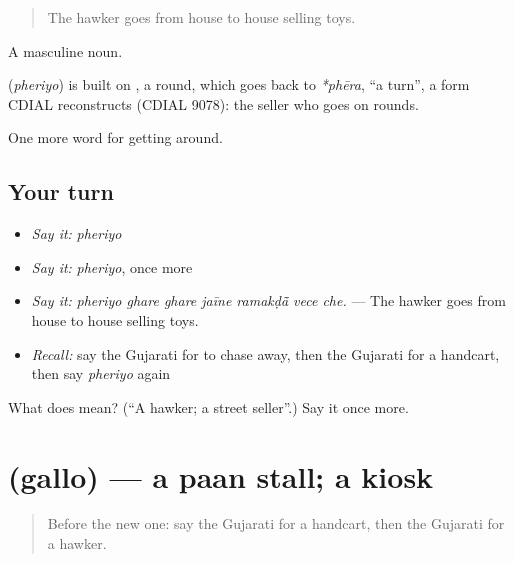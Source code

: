 \begin{quote}
The hawker goes from house to house selling toys.
\end{quote}

A masculine noun.

\begin{cousinweb}
\textbf{} (\emph{pheriyo}) is built on , a round, which goes back to \emph{*phēra}, \textquotedblleft{}a turn\textquotedblright{}, a form CDIAL reconstructs (CDIAL 9078): the seller who goes on rounds.
\end{cousinweb}

\begin{grammarlens}[title={What you've built}]
One more word for getting around.
\end{grammarlens}

\subsection*{Your turn}
\begin{itemize}
\raggedright
  \item \emph{Say it:} \emph{pheriyo}
  \item \emph{Say it:} \emph{pheriyo}, once more
  \item \emph{Say it:} \emph{pheriyo ghare ghare jaīne ramakḍā̃ vece che.} — The hawker goes from house to house selling toys.
  \item \emph{Recall:} say the Gujarati for to chase away, then the Gujarati for a handcart, then say \emph{pheriyo} again
\end{itemize}

\begin{tcolorbox}[breakable,colback=teal!4,colframe=teal!35!black,title={Before you move on}]
What does  mean? (\textquotedblleft{}A hawker; a street seller\textquotedblright{}.) Say it once more.
\end{tcolorbox}
\section[\texorpdfstring{\gu{ગલ્લો} (gallo)}{ગલ્લો (gallo)}]{ (gallo) — a paan stall; a kiosk}

\label{lesson:GU-C422-gallo}



\begin{quote}
Before the new one: say the Gujarati for a handcart, then the Gujarati for a hawker.
\end{quote}

